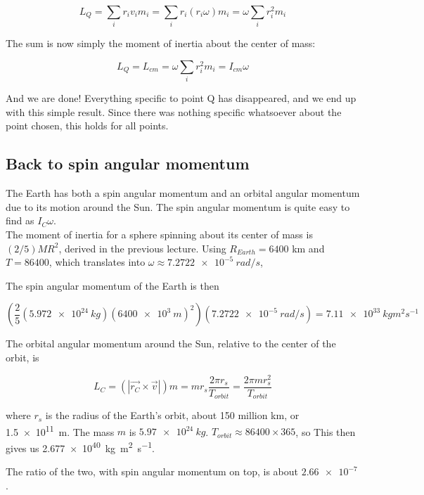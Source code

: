 \begin{equation}
L_Q = \sum_i r_i v_i m_i = \sum_i r_i (r_i \omega) m_i = \omega \sum_i r_i^2 m_i
\end{equation}

The sum is now simply the moment of inertia about the center of mass:

\begin{equation}
L_Q = L_{cm} = \omega \sum_i r_i^2 m_i = I_{cm} \omega
\end{equation}

And we are done! Everything specific to point Q has disappeared, and we end up with this simple result. Since there was nothing specific whatsoever about the point chosen, this holds for all points.

\subsection{Back to spin angular momentum}

The Earth has both a spin angular momentum and an orbital angular momentum due to its motion around the Sun. The spin angular momentum is quite easy to find as $I_C \omega$.\\
The moment of inertia for a sphere spinning about its center of mass is $\displaystyle (2/5) M R^2$, derived in the previous lecture. Using $R_{Earth} = 6400$ km and $T = 86400$, which translates into $\omega \approx \SI{7.2722e-5}{rad/s}$, 

The spin angular momentum of the Earth is then

\begin{equation}
\left(\frac{2}{5} (\SI{5.972e24}{kg}) (\SI{6400e3}{m})^2\right) (\SI{7.2722e-5}{rad/s}) = \SI{7.11e33}{kg m^2 s^{-1}}
\end{equation}

The orbital angular momentum around the Sun, relative to the center of the orbit, is

\begin{equation}
L_C = (|\vec{r_C} \times \vec{v}|) m = m r_s \frac{2 \pi r_s}{T_{orbit}} = \frac{2 \pi m r_s^2}{T_{orbit}}
\end{equation}

where $r_s$ is the radius of the Earth's orbit, about 150 million km, or \SI{1.5e11}{m}. The mass $m$ is $\SI{5.97e24}{kg}$. $T_{orbit} \approx 86400 \times 365$, so
This then gives us \SI{2.677e40}{kg m^2 s^{-1}}.

The ratio of the two, with spin angular momentum on top, is about $\num{2.66e-7}$.

